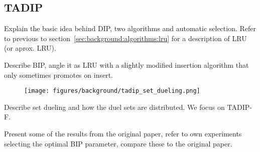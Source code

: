 
\subsection{TADIP}
\label{sec:background:algorithms:tadip}

Explain the basic idea behind DIP, two algorithms and automatic selection. 
Refer to previous to section~\ref{sec:background:algorithms:lru} for a description of LRU (or aprox. LRU).

Describe BIP, angle it as LRU with a slightly modified insertion algorithm that only sometimes promotes on insert.

\begin{figure}[t]
\texttt{[image: figures/background/tadip\_set\_dueling.png]}
\end{figure}

Describe set dueling and how the duel sets are distributed. We focus on TADIP-F.

Present some of the results from the original paper, refer to own experiments selecting the optimal BIP parameter, compare these to the original paper.
